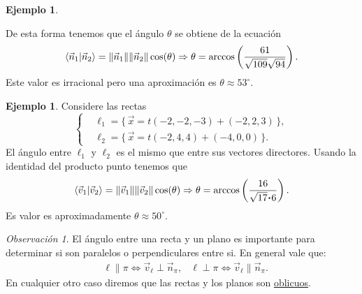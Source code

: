 \documentclass[12pt]{article}
\theoremstyle{plain}
\theoremstyle{definition}
\newtheorem{Ex}[Th]{Ejemplo}           %
\theoremstyle{remark}
\newtheorem*{Rmk}{Observación}      %
\newcommand{\te}{\theta}                %
\renewcommand{\l}{\ell}
\renewcommand{\:}{\colon}           %
\newcommand{\un}[1]{\underline{#1}}
\renewcommand{\.}{\Cdot}                %
\newcommand{\To}{\Rightarrow}
\newcommand{\set}[1]{\{\,#1\,\}}    %
\begin{document}
\begin{multicols}{2}
\begin{Ex}
\begin{center}
  \end{center}
  De esta forma tenemos que el ángulo $\te$ se obtiene de la ecuación
  $$\braket{\vec{n}_1}{\vec{n}_2}=\norm{\vec{n}_1}\norm{\vec{n}_2}\cos(\te)\To\te=\arccos\left(\frac{61}{\sqrt{109}\sqrt{94}}\right).$$
  Este valor es irracional pero una aproximación es $\te\approx53^\circ$.
\end{Ex}

\begin{Ex}
  Considere las rectas 
  $$
  \left\lbrace
  \begin{aligned}
    &\l_1=\set{\vec{x}=t(-2,-2,-3)+(-2,2,3)},\\
    &\l_2=\set{\vec{x}=t(-2,4,4)+(-4,0,0)}.
  \end{aligned}
  \right.
  $$
  El ángulo entre $\l_1$ y $\l_2$ es el mismo que entre sus vectores directores. Usando la identidad del producto punto tenemos que
  $$\braket{\vec{v}_1}{\vec{v}_2}=\norm{\vec{v}_1}\norm{\vec{v}_2}\cos(\te)\To\te=\arccos\left(\frac{16}{\sqrt{17}\.6}\right).$$
  Es valor es aproximadamente $\te\approx 50^\circ$.
\end{Ex}

\begin{Rmk}
  El ángulo entre una recta y un plano es importante para determinar si son paralelos o perpendiculares entre si. En general vale que:
  \begin{align*}
    &\l\parallel\pi\iff\vec v_\l\perp\vec n_\pi,&\l\perp\pi\iff\vec v_\l\parallel\vec n_\pi.
  \end{align*}
  En cualquier otro caso diremos que las rectas y los planos son \un{oblicuos}. 
\end{Rmk}

\end{multicols}
\end{document}
